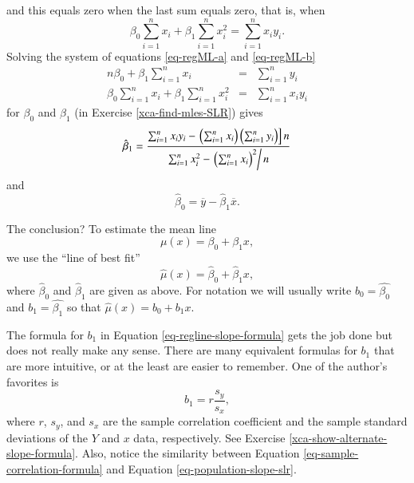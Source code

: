 \documentclass[captions=tableheading]{scrbook}
\begin{document}
and this equals zero when the last sum equals zero, that is, when
\begin{equation}
\beta_{0} \sum_{i = 1}^{n}x_{i} + \beta_{1} \sum_{i = 1}^{n}x_{i}^{2} = \sum_{i = 1}^{n}x_{i}y_{i}.\label{eq-regML-b}
\end{equation}
Solving the system of equations \ref{eq-regML-a} and \ref{eq-regML-b}
\begin{eqnarray}
n\beta_{0} + \beta_{1}\sum_{i = 1}^{n}x_{i} & = & \sum_{i = 1}^{n}y_{i}\\
\beta_{0}\sum_{i = 1}^{n}x_{i}+\beta_{1}\sum_{i = 1}^{n}x_{i}^{2} & = & \sum_{i = 1}^{n}x_{i}y_{i}
\end{eqnarray}
for \( \beta_{0} \) and \( \beta_{1} \) (in Exercise \ref{xca-find-mles-SLR}) gives
\begin{equation}
\hat{\beta}_{1} = \frac{\sum_{i = 1}^{n}x_{i}y_{i} - \left.\left(\sum_{i = 1}^{n}x_{i}\right)\left(\sum_{i = 1}^{n}y_{i}\right)\right] n}{\sum_{i = 1}^{n}x_{i}^{2} - \left.\left(\sum_{i = 1}^{n}x_{i}\right)^{2}\right/ n}\label{eq-regline-slope-formula}
\end{equation}
and
\begin{equation}
\hat{\beta}_{0} = \overline{y} - \hat{\beta}_{1}\overline{x}.
\end{equation}

The conclusion? To estimate the mean line 
\begin{equation}
\mu(x) = \beta_{0} + \beta_{1}x,
\end{equation}
we use the ``line of best fit''
\begin{equation}
\hat{\mu}(x) = \hat{\beta}_{0} + \hat{\beta}_{1}x,
\end{equation}
where \(\hat{\beta}_{0}\) and \(\hat{\beta}_{1}\) are given as above. For notation we will usually write \( b_{0} = \hat{\beta_{0}} \) and \( b_{1}=\hat{\beta_{1}} \) so that \( \hat{\mu}(x) = b_{0} + b_{1}x \).

\begin{rem}
The formula for \( b_{1} \) in Equation \ref{eq-regline-slope-formula} gets the job done but does not really make any sense. There are many equivalent formulas for \( b_{1} \) that are more intuitive, or at the least are easier to remember. One of the author's favorites is
\begin{equation}
b_{1} = r\frac{s_{y}}{s_{x}},\label{eq-sample-correlation-formula}
\end{equation}
where \(r\), \( s_{y} \), and \( s_{x} \) are the sample correlation coefficient and the sample standard deviations of the \(Y\) and \(x\) data, respectively. See Exercise \ref{xca-show-alternate-slope-formula}. Also, notice the similarity between Equation \ref{eq-sample-correlation-formula} and Equation \ref{eq-population-slope-slr}.
\end{rem}
\end{document}
